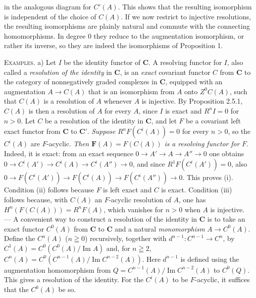 
\noindent in the analogous diagram for $C'(A)$. This shows that the resulting
isomorphism is independent of the choice of $C(A)$. If we now restrict to
injective resolutions, the resulting isomorphisms are plainly natural and
commute with the connecting homomorphisms. In degree 0 they reduce to the
augmentation isomorphism, or rather its inverse, so they are indeed the
isomorphisms of Proposition 1.

\textsc{Examples.} a) Let $I$ be the identity functor of $\mathbf{C}$. A
resolving functor for $I$, also called a \textit{resolution of the identity}
in $\mathbf{C}$, is an \textit{exact} covariant functor $C$ from $\mathbf{C}$ to the category of
nonnegatively graded complexes in $\mathbf{C}$, equipped with an augmentation
$A\to C(A)$ that is an isomorphism from $A$ onto $Z^0C(A)$,
such that $C(A)$ is a resolution of $A$ whenever $A$ is injective. By
Proposition 2.5.1, $C(A)$ is then a resolution of $A$ for every $A$, since
$I$ is exact and $R^nI=0$ for $n>0$.
Let $C$ be a resolution of the identity in $\mathbf{C}$, and let $F$ be a
covariant left exact functor from $\mathbf{C}$ to $\mathbf{C}'$. \textit{Suppose}
$R^nF(C^i(A))=0$ for every $n>0$, so the $C^i(A)$ are $F$-acyclic.
\textit{Then $\mathbf F(A)=F(C(A))$ is a resolving functor for $F$.} Indeed,
it is exact: from an exact sequence
$0\to A'\to A\to A''\to0$
one obtains
$0\to C^i(A')\to C^i(A)\to
C^i(A'')\to0$, and since $R^1F(C^i(A'))=0$, also
$0\to F(C^i(A'))\to F(C^i(A))
\to F(C^i(A''))\to0$.
This proves (i). Condition (ii) follows because $F$ is left exact and
$C$ is exact. Condition (iii) follows because, with $C(A)$ an
$F$-acyclic resolution of $A$, one has $H^n(F(C(A)))=R^nF(A)$, which vanishes
for $n>0$ when $A$ is injective. --- A convenient way to construct a resolution of the identity in $\mathbf{C}$ is to take
an exact functor $C^0(A)$ from $\mathbf{C}$ to $\mathbf{C}$ and a natural \textit{monomorphism}
$A\to C^0(A)$. Define the $C^n(A)$ ($n\geqq0$) recursively, together with
$d^{n-1}:C^{n-1}\to C^n$, by
$C^1(A)=C^0(C^0(A)/\operatorname{Im}A)$
and, for $n\geqq2$,
$C^n(A)=C^0(C^{n-1}(A)/\operatorname{Im}C^{n-2}(A))$.
Here $d^{n-1}$ is defined using the augmentation homomorphism from
$Q=C^{n-1}(A)/\operatorname{Im}C^{n-2}(A)$ to $C^0(Q)$. This gives a
resolution of the identity. For the $C^i(A)$ to be $F$-acyclic, it suffices
that the $C^0(A)$ be so.


